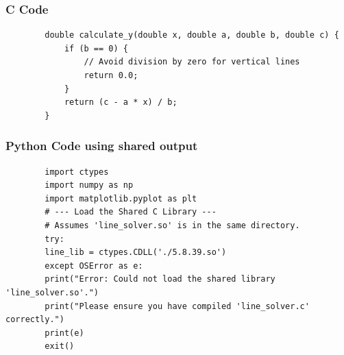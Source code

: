 \documentclass{beamer}
\begin{document}
	
	\begin{frame}[fragile]
		\frametitle{C Code}
		
		\begin{lstlisting}
		double calculate_y(double x, double a, double b, double c) {
			if (b == 0) {
				// Avoid division by zero for vertical lines
				return 0.0; 
			}
			return (c - a * x) / b;
		}
		\end{lstlisting}
	\end{frame}
	\begin{frame}[fragile]
		\frametitle{Python Code using shared output}
		
		\begin{lstlisting}
		import ctypes
		import numpy as np
		import matplotlib.pyplot as plt
		# --- Load the Shared C Library ---
		# Assumes 'line_solver.so' is in the same directory.
		try:
		line_lib = ctypes.CDLL('./5.8.39.so')
		except OSError as e:
		print("Error: Could not load the shared library 'line_solver.so'.")
		print("Please ensure you have compiled 'line_solver.c' correctly.")
		print(e)
		exit()		
		\end{lstlisting}
	\end{frame}
	
\end{document}

